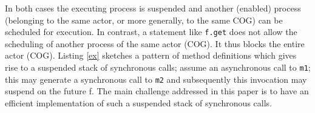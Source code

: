 In both cases the executing process is suspended and another (enabled) process (belonging to the same actor, or more generally, to the same COG) can be scheduled for execution.
In contrast, a statement like \lstinline|f.get| does not allow the scheduling of
another process of the same actor (COG). It thus blocks the entire actor (COG). Listing \ref{ex} sketches a pattern of method definitions which gives rise to a suspended stack of synchronous calls; assume an asynchronous call to \lstinline|m1|; this may generate a synchronous call to \lstinline|m2| and subsequently this invocation may suspend on the future f. The main challenge addressed in this paper is to have an efficient implementation of such a suspended stack of synchronous calls.

%



